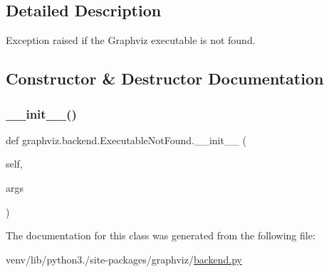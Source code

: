 \subsection{Detailed Description}
\begin{DoxyVerb}Exception raised if the Graphviz executable is not found.\end{DoxyVerb}
 

\subsection{Constructor \& Destructor Documentation}
\mbox{\label{classgraphviz_1_1backend_1_1ExecutableNotFound_acca85f580feb59bede5e90e8cf5450e9}} 
\subsubsection{\texorpdfstring{\+\_\+\+\_\+init\+\_\+\+\_\+()}{\_\_init\_\_()}}
{\footnotesize\ttfamily def graphviz.\+backend.\+Executable\+Not\+Found.\+\_\+\+\_\+init\+\_\+\+\_\+ (\begin{DoxyParamCaption}\item[{}]{self,  }\item[{}]{args }\end{DoxyParamCaption})}



The documentation for this class was generated from the following file\+:\begin{DoxyCompactItemize}
\item 
venv/lib/python3./site-\/packages/graphviz/\hyperlink{backend_8py}{backend.\+py}\end{DoxyCompactItemize}
